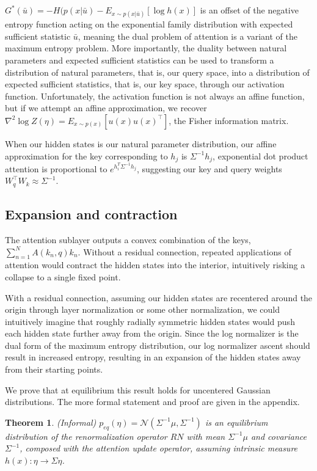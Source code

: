 \documentclass{article}
\newtheorem{theorem}{Theorem}
\begin{document}
$G^*( \bar{u} ) = -H( p( x \vert \bar{u} ) - E_{ x \sim p( x \vert \bar{u} ) } \left[ \log h(x) \right]$ is an offset of the negative entropy function acting on the exponential family distribution with expected sufficient statistic $\bar{u}$, meaning the dual problem of attention is a variant of the maximum entropy problem.
More importantly, the duality between natural parameters and expected sufficient statistics can be used to transform a distribution of natural parameters, that is, our query space, into a distribution of expected sufficient statistics, that is, our key space, through our activation function. Unfortunately, the activation function is not always an affine function, but if we attempt an affine approximation, we recover $\nabla^2 \log Z(\eta) = E_{ x \sim p(x)} \left[ u(x) u(x)^\intercal \right]$, the Fisher information matrix.

When our hidden states is our natural parameter distribution, our affine approximation for the key corresponding to $h_j$ is $\Sigma^{-1} h_j$, exponential dot product attention is proportional to $ e^{h_i^T \Sigma^{-1} h_j} $, suggesting our key and query weights $W_q^\intercal W_k \approx \Sigma^{-1}$.

\subsection{Expansion and contraction}
\label{expansion and contraction}

The attention sublayer outputs a convex combination of the keys, $\sum_{n=1}^N A(k_n,q) k_n$. Without a residual connection, repeated applications of attention would contract the hidden states into the interior, intuitively risking a collapse to a single fixed point.

With a residual connection, assuming our hidden states are recentered around the origin through layer normalization or some other normalization, we could intuitively imagine that roughly radially symmetric hidden states would push each hidden state further away from the origin.
Since the log normalizer is the dual form of the maximum entropy distribution, our log normalizer ascent should result in increased entropy, resulting in an expansion of the hidden states away from their starting points.

We prove that at equilibrium this result holds for uncentered Gaussian distributions. The more formal statement and proof are given in the appendix.

\begin{theorem}
  (Informal) $p_{eq}(\eta) = \mathcal{N}( \Sigma^{-1} \mu, \Sigma^{-1} )$ is an equilibrium distribution of the renormalization operator $RN$ with mean $\Sigma^{-1} \mu$ and covariance $\Sigma^{-1}$,  composed with the attention update operator, assuming intrinsic measure $h(x): \eta \rightarrow \Sigma \eta$.
  \label{informal theorem equilibrium}
\end{theorem}
\end{document}
